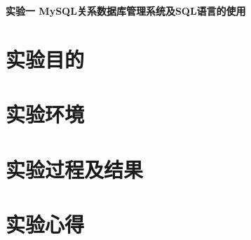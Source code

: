 \documentclass{ML}
\begin{document}
\maketitle

\newpage

\begin{center}
    \textbf{ 实验一 MySQL关系数据库管理系统及SQL语言的使用}
\end{center}

\section{实验目的}

\section{实验环境}

\section{实验过程及结果}

\section{实验心得}


\end{document}
